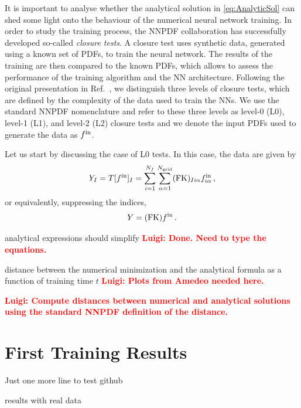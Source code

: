 \documentclass[11pt]{article}
\newcommand{\ldd}[1]{\textcolor{red}{\textbf{Luigi: #1}}}
\begin{document}
It is important to analyse whether the analytical solution in \eqref{eq:AnalyticSol} can 
shed some light onto the behaviour of the numerical neural network training. 
In order to study the training process, the NNPDF collaboration has successfully developed so-called 
{\em closure tests}. A closure test uses synthetic data, generated using a known 
set of PDFs, to train the neural network. The results of the training are then compared to the
known PDFs, which allows to assess the performance of the training algorithm and the NN
architecture. Following the original presentation in Ref.~\cite{NNPDF:2014otw}, we distinguish three
levels of closure tests, which are defined by the complexity of the data used to train the NNs. 
We use the standard NNPDF nomenclature and refer to these three levels as level-0 (L0), level-1 (L1), 
and level-2 (L2) closure tests and we denote the input PDFs used to generate the data as $f^{\rm in}$. 

Let us start by discussing the case of L0 tests. In this case, the data are given by
\begin{equation}
    \label{eq:DataL0}
    Y_I = T[f^{\rm in}]_I 
        = \sum_{i=1}^{N_{f}} \sum_{\alpha=1}^{N_{\mathrm{grid}}} (\mathrm{FK})_{Ii\alpha} f^{\rm in}_{i\alpha}\, ,
\end{equation}
or equivalently, suppressing the indices,
\begin{equation}
    \label{eq:DataL0NoIndices}
    Y = (\mathrm{FK}) f^{\rm in}\, .
\end{equation}


analytical expressions should simplify \ldd{Done. Need to type the equations. }

distance between the numerical minimization and the analytical formula as a function of
training time $t$ \ldd{Plots from Amedeo needed here.}

\ldd{Compute distances between numerical and analytical solutions using the standard NNPDF definition of the
distance.}


\newpage


\section{First Training Results}

Just one more line to test github

 results with real data



\end{document}
